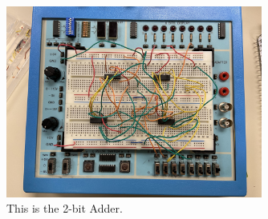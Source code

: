 \documentclass[11pt]{article}
\begin{document}
\begin{figure}[ht]\centering
	\includegraphics[width=0.75\textwidth]{2-bit Adder}
	\caption{This is the 2-bit Adder.}
	\label{fig:original_logo}			%
\end{figure}
\end{document}
